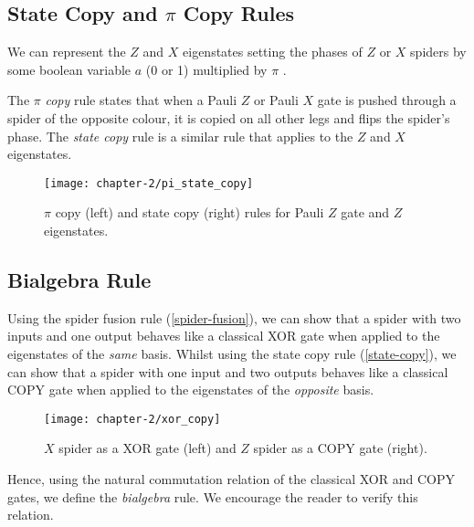 
\subsection{State Copy and $\pi$ Copy Rules}%

We can represent the $Z$ and $X$ eigenstates setting the phases of $Z$ or $X$ spiders by some boolean variable $a$ (0 or 1) multiplied by $\pi$ \cite{Wetering2020}. 

%

The $\pi$ \textit{copy} rule states that when a Pauli $Z$ or Pauli $X$ gate is pushed through a spider of the opposite colour, it is copied on all other legs and flips the spider's phase. The \textit{state copy} rule is a similar rule that applies to the $Z$ and $X$ eigenstates.

\begin{figure}[H]
    \centering
    \texttt{[image: chapter-2/pi\_state\_copy]}
    \caption{$\pi$ copy (left) and state copy (right) rules for Pauli $Z$ gate and $Z$ eigenstates.}
    \label{state-copy}
    \label{pi-copy}
\end{figure}


\subsection{Bialgebra Rule}%
Using the spider fusion rule (\ref{spider-fusion}), we can show that a spider with two inputs and one output behaves like a classical XOR gate when applied to the eigenstates of the \textit{same} basis. Whilst using the state copy rule (\ref{state-copy}), we can show that a spider with one input and two outputs behaves like a classical COPY gate when applied to the eigenstates of the \textit{opposite} basis.

\begin{figure}[H]
    \centering
    \texttt{[image: chapter-2/xor\_copy]}
    \caption{$X$ spider as a XOR gate (left) and $Z$ spider as a COPY gate (right).}
\end{figure}

Hence, using the natural commutation relation of the classical XOR and COPY gates, we define the \textit{bialgebra} rule. We encourage the reader to verify this relation.

%
\label{bialgebra}





